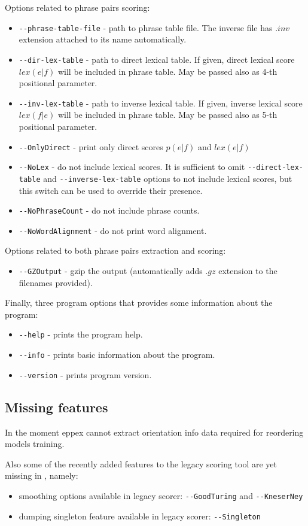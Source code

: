 Options related to phrase pairs scoring:
\begin{itemize}
 \item \verb|--phrase-table-file| - path to phrase table file.
  The inverse file has $.inv$ extension attached to its name automatically.
 \item \verb|--dir-lex-table| - path to direct lexical table.
  If given, direct lexical score $lex(e|f)$ will be included in phrase table.
  May be passed also as 4-th positional parameter.
 \item \verb|--inv-lex-table| - path to inverse lexical table.  
  If given, inverse lexical score $lex(f|e)$ will be included in phrase table.
  May be passed also as 5-th positional parameter.
 \item \verb|--OnlyDirect| - print only direct scores $p(e|f)$ and $lex(e|f)$
 \item \verb|--NoLex| - do not include lexical scores.
  It is sufficient to omit \verb|--direct-lex-table| and \verb|--inverse-lex-table|
  options to not include lexical scores, but this switch can be used to
  override their presence.
 \item \verb|--NoPhraseCount| - do not include phrase counts.  
 \item \verb|--NoWordAlignment| - do not print word alignment.
\end{itemize}

Options related to both phrase pairs extraction and scoring:
\begin{itemize}
 \item \verb|--GZOutput| - gzip the output (automatically
  adds $.gz$ extension to the filenames provided).
\end{itemize}

Finally, three program options that provides some information about the program:
\begin{itemize}
 \item \verb|--help| - prints the program help.
 \item \verb|--info| - prints basic information about the program.
 \item \verb|--version| - prints program version.
\end{itemize}

\subsection{Missing features}

In the moment eppex cannot extract orientation info data required for reordering models training.

Also some of the recently added features to the legacy scoring tool are yet missing in \eppex{},
namely:
\begin{itemize}
  \item smoothing options available in legacy scorer: \verb|--GoodTuring| and \verb|--KneserNey|
  \item dumping singleton feature available in legacy scorer: \verb|--Singleton|
\end{itemize}
